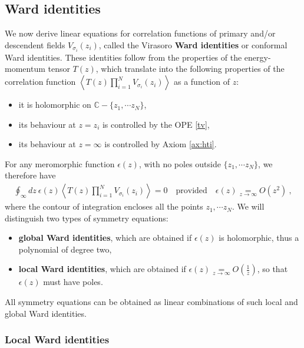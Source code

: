 \documentclass[12pt, a4paper, notitlepage, twoside]{report}
\numberwithin{equation}{section}
\theoremstyle{break}
\begin{document}
\subsection{Ward identities \label{secswi}}

We now derive linear equations for correlation functions of primary and/or descendent fields $V_{\sigma_i}(z_i)$, called the Virasoro \textbf{\boldmath Ward identities} or conformal Ward identities.
These identities follow from the properties of the energy-momentum tensor $T(z)$, which translate into the following properties of the correlation function $\left\langle T(z)\prod_{i=1}^N V_{\sigma_i}(z_i) \right\rangle$ as a function of $z$:
\begin{itemize}
 \item it is holomorphic on ${\mathbb{C}}-\{z_1,\cdots z_N\}$,
\item its behaviour at $z=z_i$ is controlled by the OPE \eqref{tv},
\item its behaviour at $z=\infty$ is controlled by Axiom \ref{ax:hti}.
\end{itemize}
For any meromorphic function $\epsilon(z)$, with no poles outside $\{z_1,\cdots z_N\}$, we therefore have
\begin{align}
 \oint_\infty dz\ \epsilon(z) \left\langle T(z)\prod_{i=1}^N V_{\sigma_i}(z_i) \right\rangle = 0 \quad \text{provided} \quad \epsilon(z)\underset{z\to\infty}{=} O(z^2)\ ,
\label{oiz}
\end{align}
where the contour of integration encloses all the points $z_1,\cdots z_N$.
We will distinguish two types of symmetry equations:
\begin{itemize}
 \item \textbf{\boldmath global Ward identities}, which are obtained if $\epsilon(z)$ is holomorphic, thus a polynomial of degree two, 
\item \textbf{\boldmath local Ward identities}, which are obtained if $\epsilon(z) \underset{z\to\infty}{=} O(\frac{1}{z})$, so that $\epsilon(z)$ must have poles.
\end{itemize}
All symmetry equations can be obtained as linear combinations of such local and global Ward identities.

\subsubsection{Local Ward identities}
\end{document}
